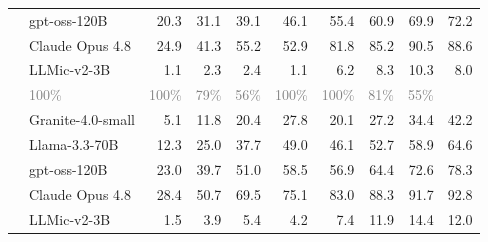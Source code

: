\begin{tabular}{llrrrrrrrr}
 & gpt-oss-120B & 20.3 & 31.1 & 39.1 & 46.1 & 55.4 & 60.9 & 69.9 & 72.2 \\
 & Claude Opus 4.8 & 24.9 & 41.3 & 55.2 & 52.9 & 81.8 & 85.2 & 90.5 & 88.6 \\
 & LLMic-v2-3B & 1.1 & 2.3 & 2.4 & 1.1 & 6.2 & 8.3 & 10.3 & 8.0 \\
\addlinespace
\multicolumn{2}{l}{\textit{$|a|>k$ (informative)}} & \textcolor{gray}{100\%} & \textcolor{gray}{100\%} & \textcolor{gray}{79\%} & \textcolor{gray}{56\%} & \textcolor{gray}{100\%} & \textcolor{gray}{100\%} & \textcolor{gray}{81\%} & \textcolor{gray}{55\%} \\
 & Granite-4.0-small & 5.1 & 11.8 & 20.4 & 27.8 & 20.1 & 27.2 & 34.4 & 42.2 \\
 & Llama-3.3-70B & 12.3 & 25.0 & 37.7 & 49.0 & 46.1 & 52.7 & 58.9 & 64.6 \\
 & gpt-oss-120B & 23.0 & 39.7 & 51.0 & 58.5 & 56.9 & 64.4 & 72.6 & 78.3 \\
 & Claude Opus 4.8 & 28.4 & 50.7 & 69.5 & 75.1 & 83.0 & 88.3 & 91.7 & 92.8 \\
 & LLMic-v2-3B & 1.5 & 3.9 & 5.4 & 4.2 & 7.4 & 11.9 & 14.4 & 12.0 \\
\bottomrule
\end{tabular}
